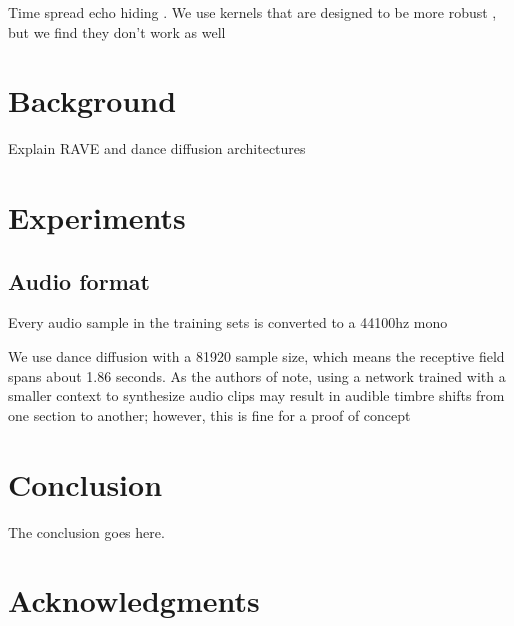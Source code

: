 \documentclass[lettersize,journal]{IEEEtran}
\begin{document}
Time spread echo hiding \cite{ko2005time}.  We use kernels that are designed to be more robust \cite{xiang2010effective}, but we find they don't work as well


\section{Background}

Explain RAVE and dance diffusion architectures

\section{Experiments}

\subsection{Audio format}
Every audio sample in the training sets is converted to a 44100hz mono 

We use dance diffusion with a 81920 sample size, which means the receptive field spans about 1.86 seconds.  As the authors of \cite{hawthornemulti} note, using a network trained with a smaller context to synthesize audio clips may result in audible timbre shifts from one section to another; however, this is fine for a proof of concept


\section{Conclusion}
The conclusion goes here.


\section*{Acknowledgments}








\end{document}
